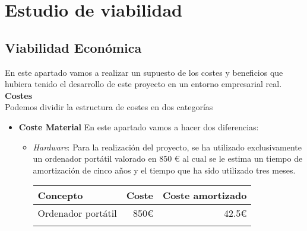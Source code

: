 \section{Estudio de viabilidad}
\subsection{Viabilidad Económica}
En este apartado vamos a realizar un supuesto de los costes y beneficios que hubiera tenido el desarrollo de este proyecto en un entorno empresarial real.\\
\textbf{Costes}\\
Podemos dividir la estructura de costes en dos categorías 
\begin{itemize}
	\item \textbf{Coste Material}
	En este apartado vamos a hacer dos diferencias:
	\begin{itemize}
		\item \emph{Hardware}: Para la realización del proyecto, se ha utilizado exclusivamente un ordenador portátil valorado en 850 \euro{} al cual se le estima un tiempo de amortización de cinco años y el tiempo que ha sido utilizado tres meses.
		
\begin{longtable}[]{@{}lrr@{}}
\toprule
\begin{minipage}[b]{0.29\columnwidth}\raggedright\strut
\textbf{Concepto}\strut
\end{minipage} & \begin{minipage}[b]{0.18\columnwidth}\raggedright\strut
\textbf{Coste}\strut
\end{minipage} & \begin{minipage}[b]{0.32\columnwidth}\raggedright\strut
\textbf{Coste amortizado}\strut
\end{minipage}\tabularnewline
\midrule
\endhead
\begin{minipage}[t]{0.29\columnwidth}\raggedright\strut
Ordenador portátil\strut
\end{minipage} & \begin{minipage}[t]{0.18\columnwidth}\raggedright\strut
850\euro{}\strut
\end{minipage} & \begin{minipage}[t]{0.32\columnwidth}\raggedright\strut
42.5\euro{}\strut
\end{minipage}\tabularnewline
\midrule
\begin{minipage}[t]{0.29\columnwidth}\raggedright\strut
\end{minipage}\tabularnewline


\end{longtable}
\end{itemize}
\end{itemize}
